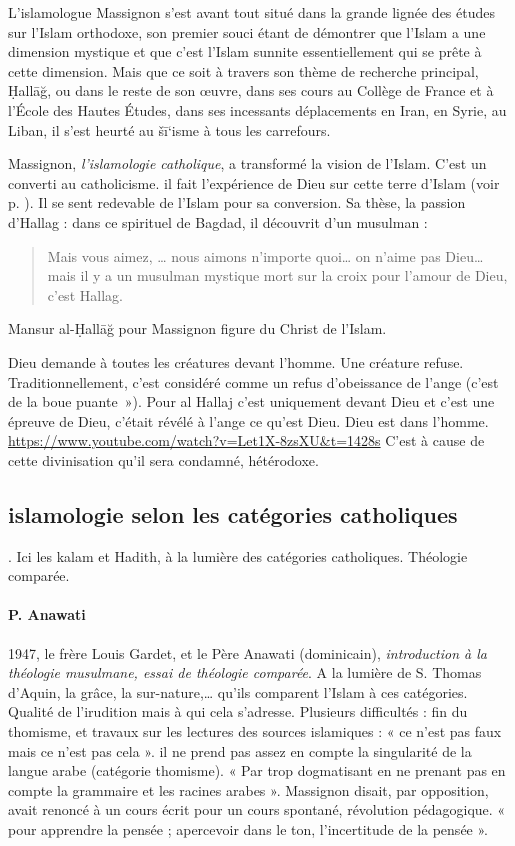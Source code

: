 L’islamologue Massignon s’est avant tout situé dans la grande lignée des études sur l’Islam orthodoxe, son premier souci étant de démontrer que l’Islam a une dimension mystique et que c’est l’Islam sunnite essentiellement qui se prête à cette dimension. Mais que ce soit à travers son thème de recherche principal, Ḥallāğ, ou dans le reste de son œuvre, dans ses cours au Collège de France et à l’École des Hautes Études, dans ses incessants déplacements en Iran, en Syrie, au Liban, il s’est heurté au šī‘isme à tous les carrefours.

Massignon, \emph{l’islamologie catholique}, a transformé la vision de l’Islam. C’est un converti au catholicisme. il fait l’expérience de Dieu sur cette terre d’Islam (voir p. \pageref{fig:Ctesiphon}). Il se sent redevable de l’Islam pour sa conversion. Sa thèse, la passion d’Hallag : dans ce spirituel de Bagdad, il découvrit d’un musulman : 
\begin{quote}
Mais vous aimez, … nous aimons n’importe quoi… on n’aime pas Dieu… mais il y a un musulman mystique mort sur la croix pour l’amour de Dieu, c’est Hallag.
\end{quote}

{Mansur al-Ḥallāğ pour Massignon} figure du Christ de l'Islam.

  Dieu demande à toutes les créatures devant l'homme. Une créature
  refuse. Traditionnellement, c'est considéré comme un refus
  d'obeissance de l'ange (c'est de la boue puante~»). Pour al Hallaj
  c'est uniquement devant Dieu et c'est une épreuve de Dieu, c'était
  révélé à l'ange ce qu'est Dieu. Dieu est dans l'homme.
  \url{https://www.youtube.com/watch?v=Let1X-8zsXU\&t=1428s}
  C'est à cause de cette divinisation qu'il sera condamné, hétérodoxe.



\subsection{ islamologie selon les catégories catholiques}.
Ici les kalam et Hadith, à la lumière des catégories catholiques. Théologie comparée. 

\paragraph{P. Anawati}
1947,  le frère Louis Gardet,  et le Père Anawati (dominicain), \emph{introduction à la théologie musulmane, essai de théologie comparée}. A la lumière de S. Thomas d’Aquin, la grâce, la sur-nature,… qu’ils comparent l’Islam à ces catégories. Qualité de l’irudition mais à qui cela s’adresse. Plusieurs difficultés : fin du thomisme, et travaux sur les lectures des sources islamiques : « ce n’est pas faux mais ce n’est pas cela ». il ne prend pas assez en compte la singularité de la langue arabe (catégorie thomisme). « Par trop dogmatisant en ne prenant pas en compte la grammaire et les racines arabes ».  Massignon disait, par opposition, avait renoncé à un cours écrit pour un cours spontané, révolution pédagogique. « pour apprendre la pensée ; apercevoir dans le ton, l’incertitude de la pensée ». 
